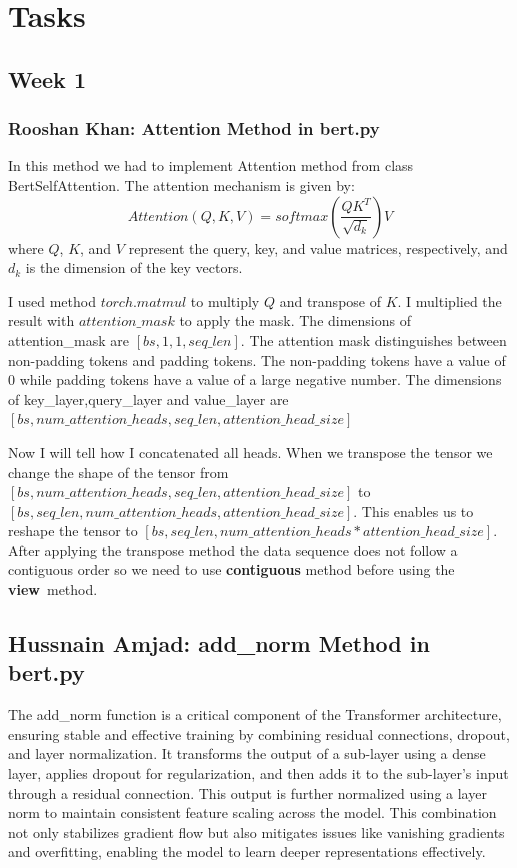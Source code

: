 \documentclass{article}
\begin{document}
\section{Tasks}
\subsection{Week 1}
\subsubsection{Rooshan Khan: Attention Method in bert.py}
In this method we had to implement Attention method from class BertSelfAttention. The attention mechanism is given by:
\begin{equation} \label{eqn4}
Attention(Q,K,V) = {softmax(\frac{QK^T}{\sqrt{d_k}})V}
\end{equation}
where \( Q \), \( K \), and \( V \) represent the query, key, and value matrices, respectively, and \( d_k \) is the dimension of the key vectors.

I used method \( torch.matmul \) to multiply \( Q \) and transpose of \( K \). I multiplied the result with \( attention\_mask \) to apply the mask. The dimensions of attention\_mask are \( [bs, 1, 1, seq\_len] \). The attention mask distinguishes between non-padding tokens and padding tokens. The non-padding tokens have a value of 0 while padding tokens have a value of a large negative number. The dimensions of key\_layer,query\_layer and value\_layer are \( [bs, num\_attention\_heads, seq\_len, attention\_head\_size] \)

Now I will tell how I concatenated all heads. When we transpose the tensor we change the shape of the tensor from \( [bs,num\_attention\_heads,seq\_len,attention\_head\_size] \) to \( [bs,seq\_len,num\_attention\_heads,attention\_head\_size] \). This enables us to reshape the tensor to \( [bs,seq\_len,num\_attention\_heads*attention\_head\_size] \). After applying the transpose method the data sequence does not follow a contiguous order so we need to use \textbf{contiguous} method before using the \textbf{view}\ method.

\subsection{Hussnain Amjad: add\_norm Method in bert.py}
The add\_norm function is a critical component of the Transformer architecture, ensuring stable and effective training by combining residual connections, dropout, and layer normalization. It transforms the output of a sub-layer using a dense layer, applies dropout for regularization, and then adds it to the sub-layer's input through a residual connection. This output is further normalized using a layer norm to maintain consistent feature scaling across the model. This combination not only stabilizes gradient flow but also mitigates issues like vanishing gradients and overfitting, enabling the model to learn deeper representations effectively.
\end{document}
